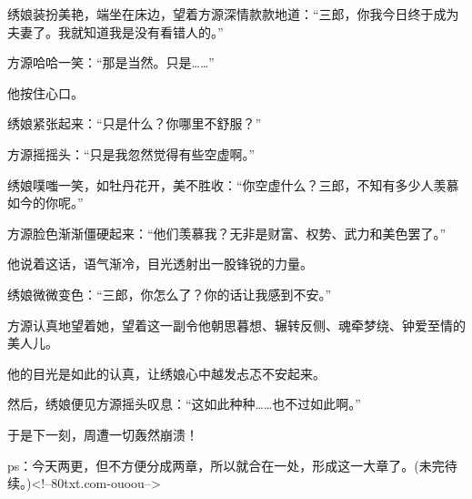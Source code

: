 \begin{this_body}
绣娘装扮美艳，端坐在床边，望着方源深情款款地道：“三郎，你我今日终于成为夫妻了。我就知道我是没有看错人的。”

方源哈哈一笑：“那是当然。只是……”

他按住心口。

绣娘紧张起来：“只是什么？你哪里不舒服？”

方源摇摇头：“只是我忽然觉得有些空虚啊。”

绣娘噗嗤一笑，如牡丹花开，美不胜收：“你空虚什么？三郎，不知有多少人羡慕如今的你呢。”

方源脸色渐渐僵硬起来：“他们羡慕我？无非是财富、权势、武力和美色罢了。”

他说着这话，语气渐冷，目光透射出一股锋锐的力量。

绣娘微微变色：“三郎，你怎么了？你的话让我感到不安。”

方源认真地望着她，望着这一副令他朝思暮想、辗转反侧、魂牵梦绕、钟爱至情的美人儿。

他的目光是如此的认真，让绣娘心中越发忐忑不安起来。

然后，绣娘便见方源摇头叹息：“这如此种种……也不过如此啊。”

于是下一刻，周遭一切轰然崩溃！

ps：今天两更，但不方便分成两章，所以就合在一处，形成这一大章了。(未完待续。)<!--80txt.com-ouoou-->

\end{this_body}

